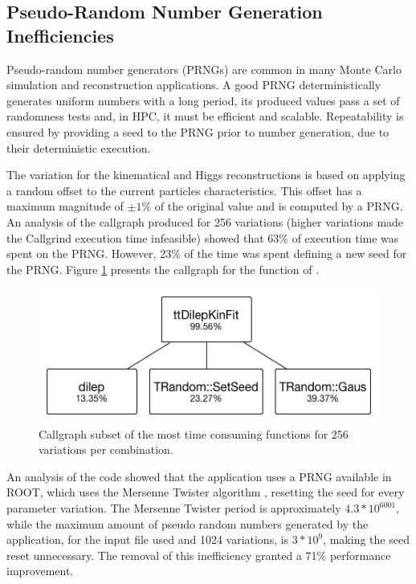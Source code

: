 \subsection{Pseudo-Random Number Generation Inefficiencies}

Pseudo-random number generators (PRNGs) are common in many Monte Carlo simulation and reconstruction applications. A good PRNG deterministically generates uniform numbers with a long period, its produced values pass a set of randomness tests and, in HPC, it must be efficient and scalable. Repeatability is ensured by providing a seed to the PRNG prior to number generation, due to their deterministic execution.

The variation for the kinematical and Higgs reconstructions is based on applying a random offset to the current particles characteristics. This offset has a maximum magnitude of $\pm1\%$ of the original value and is computed by a PRNG. An analysis of the callgraph produced for 256 variations (higher variations made the Callgrind execution time infeasible) showed that 63\% of \tth execution time was spent on the PRNG. However, 23\% of the time was spent defining a new seed for the PRNG. Figure \ref{fig:prng256} presents the callgraph for the \ttDilepKinFit function of \tth.

\begin{figure}[!htp]
	\begin{center}
		\includegraphics[scale=0.5]{images/prng_256_edited.png}
		\caption{Callgraph subset of the \ttDilepKinFit most time consuming functions for 256 variations per combination.}
		\label{fig:prng256}
	\end{center}
\end{figure}

An analysis of the code showed that the application uses a PRNG available in ROOT, which uses the Mersenne Twister algorithm \cite{MersenneTwister}, resetting the seed for every parameter variation. The Mersenne Twister period is approximately $4.3 * 10^{6001}$, while the maximum amount of pseudo random numbers generated by the application, for the input file used and 1024 variations, is $3 * 10^9$, making the seed reset unnecessary. The removal of this inefficiency granted a 71\% performance improvement.

